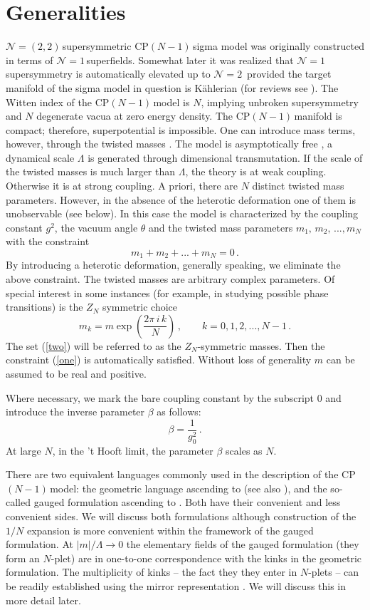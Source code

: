 \documentclass[epsfig,12pt]{article}
\def\beq{\begin{equation}}
\def\eeq{\end{equation}}
\newcommand{\ntwo}{${\mathcal N}=2\,$}
\newcommand{\none}{${\mathcal N}=1\,$}
\newcommand{\ntt}{${\mathcal N}=(2,2)\,$}
\newcommand{\cpn}{CP$(N-1)\,$}
\def\beq{\begin{equation}}
\def\eeq{\end{equation}}
\begin{document}
\newpage
{\small \tableofcontents}
\newpage



\section{Generalities}
\label{genera}
\setcounter{equation}{0}

\ntt supersymmetric \cpn sigma model was originally constructed 
\cite{orco}
in terms of \none superfields. Somewhat later it was realized \cite{Bruno}
that 
\none supersymmetry is automatically elevated up to \ntwo
provided the target manifold of the sigma model in question is K\"ahlerian (for reviews see \cite{rev1,rev2}).
The Witten index \cite{WI} of the \cpn model is $N$, implying unbroken supersymmetry
and $N$ degenerate vacua at zero energy density.
The \cpn manifold is compact; therefore, superpotential is impossible.
One can introduce mass terms, however, through the twisted masses \cite{twisted}.
The model is asymptotically free \cite{BelPo}, a dynamical scale $\Lambda$ is generated through dimensional transmutation. If the scale of the twisted masses is much larger than $\Lambda$, the theory is at weak coupling.
Otherwise it is at strong coupling. A priori, there are $N$ distinct twisted mass parameters.
However, in the absence of the heterotic deformation one of them is unobservable
(see below). In this case the model is characterized by the coupling constant $g^2$,
the vacuum angle $\theta$ and the twisted mass parameters $m_1,\,m_2,\, ..., m_N$
with the constraint
\beq
m_1 + m_2 + ... +m_N =0\,.
\label{one}
\eeq
By introducing a heterotic deformation, generally speaking, we eliminate the above constraint.
The twisted masses are arbitrary complex parameters. Of special interest 
in some instances (for example, in studying possible phase transitions)
is the $Z_N$ symmetric choice
\beq
m_k = m\exp\left(\frac{2\pi \,i\, k}{N}\right)\,,\qquad k = 0,1,2, ... ,N-1\,.
\label{two}
\eeq
The set (\ref{two}) will be referred to as the $Z_N$-symmetric masses.
Then the constraint
(\ref{one}) is automatically satisfied. Without loss of generality $m$ can be assumed
to be real and positive. 

Where necessary, we mark the bare coupling constant by the subscript 0 and introduce
the inverse parameter $\beta$ as follows:
\beq
\beta = \frac{1}{g_0^2}\,.
\eeq
At large $N$, in the 't Hooft limit,  the parameter $\beta$ scales as $N$.

There are two equivalent languages commonly used in the description of the \cpn model:
the geometric language ascending to \cite{Bruno} (see also \cite{rev2}), and the
so-called gauged formulation ascending to \cite{W79,W93}. Both have their convenient and less convenient sides.
We will discuss both formulations although construction of the $1/N$ expansion is
more convenient within the framework of the gauged formulation. At $|m|/\Lambda \to 0$
the elementary fields of the
gauged formulation (they form an  $N$-plet) are in one-to-one correspondence with the kinks in the geometric formulation.
The multiplicity of kinks -- the fact they they enter in $N$-plets --
can be readily established \cite{adam} using the mirror representation \cite{MR1}. We will discuss this in more detail
later. 
\end{document}
